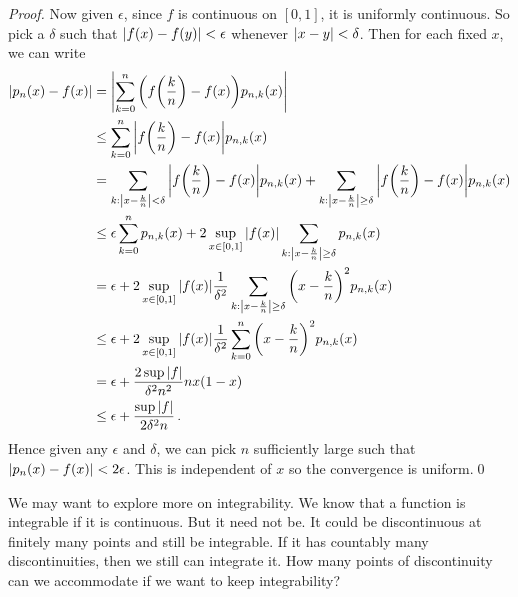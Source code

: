 \documentclass{article}
\theoremstyle{plain}\theoremheaderfont{\normalfont\itshape}\theorembodyfont{\rmfamily}\theoremseparator{.}\newtheorem*{rem}{Remark}\newtheorem*{ex}{Example}\newtheorem*{proof}{Proof}\newtheorem*{altp}{Alternative proof}
\theoremstyle{plain}\theoremheaderfont{\normalfont\bfseries}\theorembodyfont{\rmfamily}\theoremseparator{.}\newtheorem{thm}{Theorem}[section]\newtheorem{lem}[thm]{Lemma}\newtheorem{prop}[thm]{Proposition}\newtheorem*{cor}{Corollary}\newtheorem{defn}[thm]{Definition}\newtheorem{clm}[thm]{Claim}\newtheorem{clminproof}{Claim}
\theoremstyle{break}\theoremheaderfont{\normalfont\itshape}\theorembodyfont{\rmfamily}\theoremseparator{.\medskip}\newtheorem*{proofskip}{Proof}\newtheorem*{exs}{Examples}\newtheorem*{rems}{Remarks}
\theoremstyle{break}\theoremheaderfont{\normalfont\bfseries}\theorembodyfont{\rmfamily}\theoremseparator{.\medskip}\newtheorem{lemskip}[thm]{Lemma}\newtheorem{defnskip}[thm]{Definition}\newtheorem{propskip}[thm]{Proposition}\newtheorem{thmskip}[thm]{Theorem}
\newcommand{\qed}{\hfill\ensuremath{\Box}}
\begin{document}
\begin{proof}
        Now given \(\epsilon\), since \(f\) is continuous on \([0,1]\), it is uniformly continuous. So pick a \(\delta\) such that \(\abs{f(x)-f(y)}<\epsilon\) whenever \(\abs{x-y}<\delta\). Then for each fixed \(x\), we can write
        \begin{align*}
            \abs{p_n(x)-f(x)}&=\abs{\sum_{k=0}^{n}\qty(f\qty(\frac{k}{n})-f(x))p_{n,k}(x)}\\
            &\le\sum_{k=0}^{n}\abs{f\qty(\frac{k}{n})-f(x)}p_{n,k}(x)\\
            &=\sum_{k:\abs{x-\frac{k}{n}}<\delta}\abs{f\qty(\frac{k}{n})-f(x)}p_{n,k}(x)+\sum_{k:\abs{x-\frac{k}{n}}\ge\delta}\abs{f\qty(\frac{k}{n})-f(x)}p_{n,k}(x)\\
            &\le\epsilon\sum_{k=0}^{n}p_{n,k}(x)+2\sup_{x\in[0,1]}\abs{f(x)}\sum_{k:\abs{x-\frac{k}{n}}\ge\delta}p_{n,k}(x)\\
            &=\epsilon+2\sup_{x\in[0,1]}\abs{f(x)}\frac{1}{\delta^2}\sum_{k:\abs{x-\frac{k}{n}}\ge\delta}\qty(x-\frac{k}{n})^2p_{n,k}(x)\\
            &\le\epsilon+2\sup_{x\in[0,1]}\abs{f(x)}\frac{1}{\delta^2}\sum_{k=0}^{n}\qty(x-\frac{k}{n})^2p_{n,k}(x)\\
            &=\epsilon+\frac{2\sup\abs{f}}{\delta^2 n^2}nx(1-x)\\
            &\le\epsilon+\frac{\sup\abs{f}}{2\delta^2 n}\,.
        \end{align*}
        Hence given any \(\epsilon\) and \(\delta\), we can pick \(n\) sufficiently large such that \(\abs{p_n(x)-f(x)}<2\epsilon\). This is independent of \(x\) so the convergence is uniform.\qed
    \end{proof}

    We may want to explore more on integrability. We know that a function is integrable if it is continuous. But it need not be. It could be discontinuous at finitely many points and still be integrable. If it has countably many discontinuities, then we still can integrate it. How many points of discontinuity can we accommodate if we want to keep integrability?
\end{document}
